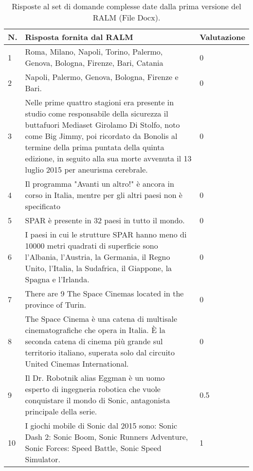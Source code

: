\begin{table}[H]
    \centering
    \begin{tabular}{|p{0.5cm} |p{6cm} |p{2cm}|}
        \hline
        \textbf{N}. & \textbf{Risposta fornita dal RALM} & \textbf{Valutazione} \\
        \hline
        1 & Roma, Milano, Napoli, Torino, Palermo, Genova, Bologna, Firenze, Bari, Catania & 0 \\
        \hline
        2 & Napoli, Palermo, Genova, Bologna, Firenze e Bari. & 0 \\
        \hline
        3 & Nelle prime quattro stagioni era presente in studio come responsabile della sicurezza il buttafuori Mediaset Girolamo Di Stolfo, noto come Big Jimmy, poi ricordato da Bonolis al termine della prima puntata della quinta edizione, in seguito alla sua morte avvenuta il 13 luglio 2015 per aneurisma cerebrale. & 0 \\
        \hline
        4 & Il programma "Avanti un altro!" è ancora in corso in Italia, mentre per gli altri paesi non è specificato & 0 \\
        \hline
        5 & SPAR è presente in 32 paesi in tutto il mondo. & 0 \\
        \hline
        6 & I paesi in cui le strutture SPAR hanno meno di 10000 metri quadrati di superficie sono l'Albania, l'Austria, la Germania, il Regno Unito, l'Italia, la Sudafrica, il Giappone, la Spagna e l'Irlanda. & 0 \\
        \hline
        7 & There are 9 The Space Cinemas located in the province of Turin. & 0 \\
        \hline
        8 & The Space Cinema è una catena di multisale cinematografiche che opera in Italia. È la seconda catena di cinema più grande sul territorio italiano, superata solo dal circuito United Cinemas International. & 0 \\
        \hline
        9 & Il Dr. Robotnik alias Eggman è un uomo esperto di ingegneria robotica che vuole conquistare il mondo di Sonic, antagonista principale della serie. & 0.5 \\
        \hline
        10 & I giochi mobile di Sonic dal 2015 sono: Sonic Dash 2: Sonic Boom, Sonic Runners Adventure, Sonic Forces: Speed Battle, Sonic Speed Simulator. & 1 \\
        \hline
    \end{tabular}
    \caption{Risposte al set di domande complesse date dalla prima versione del RALM (File Docx).}
\end{table}

